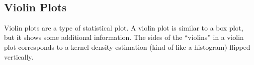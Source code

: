 \documentclass{book}
\begin{document}
    \begin{center}
    \end{center}
    { \hspace*{\fill} \\}
    
    \subsection{Violin Plots}\label{violin-plots}

    Violin plots are a type of statistical plot. A violin plot is similar to
a box plot, but it shows some additional information. The sides of the
``violins'' in a violin plot corresponds to a kernel density estimation
(kind of like a histogram) flipped vertically.
\end{document}
